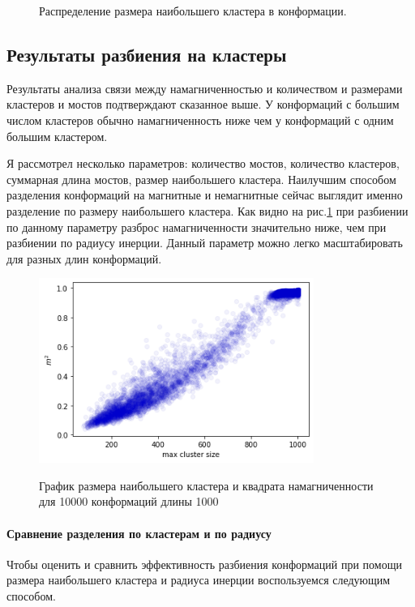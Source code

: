 \begin{figure}[H]
\begin{subfigure}[t]{0.3\textwidth}
	\end{subfigure}
	\caption{Распределение размера наибольшего кластера в конформации.}
\end{figure}


\subsection{Результаты разбиения на кластеры}
Результаты анализа связи между намагниченностью и количеством и размерами кластеров и мостов подтверждают сказанное выше. У конформаций с большим числом кластеров обычно намагниченность ниже чем у конформаций с одним большим кластером. 

Я рассмотрел несколько параметров: количество мостов, количество кластеров, суммарная длина мостов, размер наибольшего кластера. Наилучшим способом разделения конформаций на магнитные и немагнитные сейчас выглядит именно разделение по размеру наибольшего кластера. Как видно на рис.\ref{fig:mag_from_max_cluster} при разбиении по данному параметру разброс намагниченности значительно ниже, чем при разбиении по радиусу инерции. Данный параметр можно легко масштабировать для разных длин конформаций.

\begin{figure}[ht]
	\centering
	\caption{График размера наибольшего кластера и квадрата намагниченности для 10000 конформаций длины 1000}
	\includegraphics[width=0.8\textwidth]{../images/mag_from_cluster_size.png} 
	\label{fig:mag_from_max_cluster}
\end{figure}

\paragraph{Сравнение разделения по кластерам и по радиусу}
Чтобы оценить и сравнить эффективность разбиения конформаций при помощи размера наибольшего кластера и радиуса инерции воспользуемся следующим способом.

